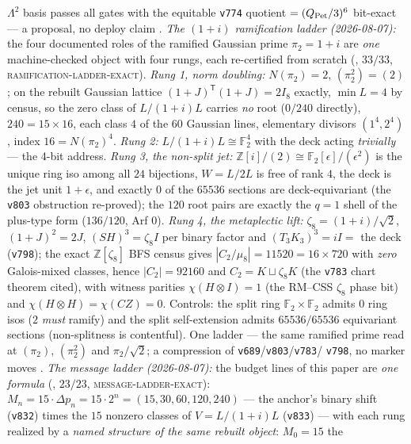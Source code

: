\documentclass[11pt,a4paper]{article}
\newcommand{\Z}{\mathbb{Z}}
\theoremstyle{definition}
\begin{document}
\begin{keybox}
$\Lambda^2$ basis passes all gates with the equitable
\texttt{v774} quotient $=(Q_{\rm Pet}/3)^6$ bit-exact --- a
proposal, no deploy claim \mE.
\emph{The $(1{+}i)$ ramification ladder (2026-08-07):} the four
documented roles of the ramified Gaussian prime $\pi_2=1{+}i$ are
\emph{one} machine-checked object with four rungs, each
re-certified from scratch
(, $33/33$,
\textsc{ramification-ladder-exact}).  \emph{Rung 1, norm
doubling:} $N(\pi_2)=2$, $(\pi_2^2)=(2)$; on the rebuilt Gaussian
lattice $(1{+}J)^{\mathsf T}(1{+}J)=2I_8$ exactly, $\min L=4$ by
census, so the zero class of $L/(1{+}i)L$ carries \emph{no} root
($0/240$ directly), $240=15\times16$, each class $4$ of the $60$
Gaussian lines, elementary divisors $(1^4,2^4)$, index
$16=N(\pi_2)^4$.  \emph{Rung 2:} $L/(1{+}i)L\cong\mathbb F_2^4$
with the deck acting \emph{trivially} --- the 4-bit address.
\emph{Rung 3, the non-split jet:}
$\Z[i]/(2)\cong\mathbb F_2[\epsilon]/(\epsilon^2)$ is the unique
ring iso among all $24$ bijections, $W=L/2L$ is free of rank $4$,
the deck is the jet unit $1{+}\epsilon$, and exactly $0$ of the
$65536$ sections are deck-equivariant (the \texttt{v803}
obstruction re-proved); the $120$ root pairs are exactly the
$q=1$ shell of the plus-type form ($136/120$, Arf $0$).
\emph{Rung 4, the metaplectic lift:} $\zeta_8=(1{+}i)/\sqrt2$,
$(1{+}J)^2=2J$, $(SH)^3=\zeta_8I$ per binary factor and
$(T_3K_3)^3=iI=$ the deck (\texttt{v798}); the exact
$\Z[\zeta_8]$ BFS census gives $|C_2/\mu_8|=11520=16\times720$
with \emph{zero} Galois-mixed classes, hence $|C_2|=92160$ and
$C_2=K\sqcup\zeta_8K$ (the \texttt{v783} chart theorem cited),
with witness parities $\chi(H{\otimes}I)=1$ (the RM--CSS
$\zeta_8$ phase bit) and $\chi(H{\otimes}H)=\chi(CZ)=0$.
Controls: the split ring $\mathbb F_2\times\mathbb F_2$ admits
$0$ ring isos ($2$ \emph{must} ramify) and the split
self-extension admits $65536/65536$ equivariant sections
(non-splitness is contentful).  One ladder --- the same ramified
prime read at $(\pi_2)$, $(\pi_2^2)$ and $\pi_2/\sqrt2$; a
compression of \texttt{v689}/\texttt{v803}/\texttt{v783}/%
\texttt{v798}, no marker moves \mE.
\emph{The message ladder (2026-08-07):} the budget lines of this
paper are \emph{one formula}
(, $23/23$,
\textsc{message-ladder-exact}): $M_n = 15\cdot\Delta p_n =
15\cdot2^n = (15, 30, 60, 120, 240)$ --- the anchor's binary
shift (\texttt{v832}) times the $15$ nonzero classes of
$V = L/(1{+}i)L$ (\texttt{v833}) --- with each rung realized by a
\emph{named structure of the same rebuilt object}: $M_0 = 15$ the

\end{keybox}
\end{document}
